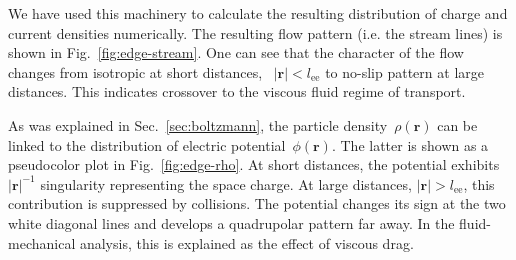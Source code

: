\documentclass[preprint,aps,eqsecnum, prb]{revtex4-1}
\begin{document}

We have used this machinery to calculate the resulting distribution
of charge and current densities numerically.
The resulting flow pattern (i.e. the stream lines) is shown in
Fig.~\ref{fig:edge-stream}. One can see that the character of the flow
changes from isotropic at short distances, ~$|{\bm r}| < l_\mathrm{ee}$ to
no-slip pattern at large distances. This indicates crossover to the viscous
fluid regime of transport.

As was explained in Sec.~\ref{sec:boltzmann}, the particle
density~$\rho({\bm r})$ can be linked to the distribution of electric
potential~$\phi({\bm r})$. The latter is shown as a pseudocolor
plot in Fig.~\ref{fig:edge-rho}. At short distances, the potential
exhibits~$|{\bm r}|^{-1}$ singularity representing the space charge.
At large distances, $|{\bm r}| > l_\mathrm{ee}$, this contribution
is suppressed by collisions.
The potential changes its sign at the two white diagonal lines and develops
a quadrupolar pattern far away.
In the fluid-mechanical analysis\cite{bib:Levitov-Falkovich}, this is
explained as the effect of viscous drag.
\end{document}
